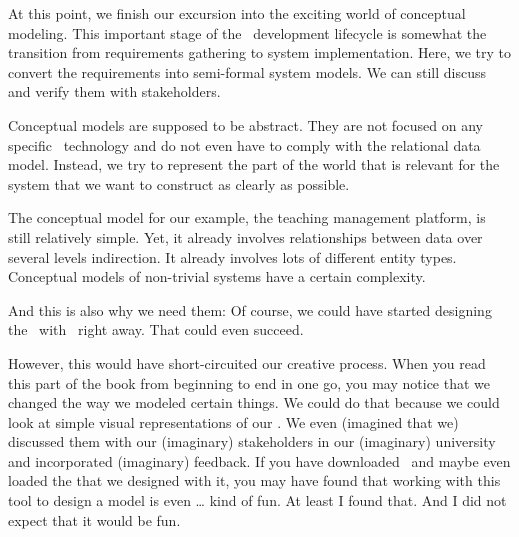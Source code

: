 %
%
At this point, we finish our excursion into the exciting world of conceptual modeling.
This important stage of the \db\ development lifecycle is somewhat the transition from requirements gathering to system implementation.
Here, we try to convert the requirements into semi-formal system models.
We can still discuss and verify them with stakeholders.

Conceptual models are supposed to be abstract.
They are not focused on any specific \db\ technology and do not even have to comply with the relational data model.
Instead, we try to represent the part of the world that is relevant for the system that we want to construct as clearly as possible.

The conceptual model for our example, the teaching management platform, is still relatively simple.
Yet, it already involves relationships between data over several levels indirection.
It already involves lots of different entity types.
Conceptual models of non-trivial systems have a certain complexity.

And this is also why we need them:
Of course, we could have started designing the \db\ with \sql\ right away.
That could even succeed.

However, this would have short-circuited our creative process.
When you read this part of the book from beginning to end in one go, you may notice that we changed the way we modeled certain things.
We could do that because we could look at simple visual representations of our \db.
We even (imagined that we) discussed them with our (imaginary) stakeholders in our (imaginary) university and incorporated (imaginary) feedback.
If you have downloaded \yEd\ and maybe even loaded the  that we designed with it, you may have found that working with this tool to design a model is even {\dots} kind of fun.
At least I found that.
And I did not expect that it would be fun.%
%
\endhsection%
%

